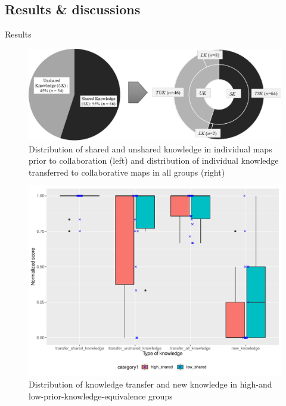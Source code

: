 \subsection{Results \& discussions}
\begin{frame}[allowframebreaks]{Results}
    \begin{figure}[tb]
     \begin{center}
      \includegraphics[width=120mm]{images/rqb_dist-knowledge.pdf}
      \end{center}
      \caption{Distribution  of  shared  and  unshared  knowledge  in  individual maps prior to collaboration (left) and distribution of individual knowledge transferred to collaborative maps in all groups (right)}
      \label{learn-effective}  
    \end{figure}
    
    \begin{figure}[tb]
     \begin{center}
      \includegraphics[width=120mm]{images/rqb_dist-shared-all-redraw.pdf}
      \end{center}
      \caption{Distribution of knowledge transfer and new knowledge in high-and  low-prior-knowledge-equivalence  groups}
      \label{learn-effective}  
    \end{figure}

\end{frame}
    
